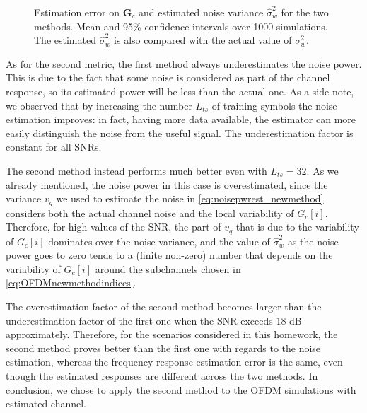 \documentclass[10pt]{article}
\begin{document}
\begin{figure}
\begin{minipage}{0.49\textwidth}
\end{minipage}
\caption{Estimation error on $\mathbf{G}_c$ and estimated noise variance $\hat{\sigma}_w^2$ for the two methods. Mean and 95\% confidence intervals over 1000 simulations. The estimated $\hat{\sigma}_w^2$ is also compared with the actual value of $\sigma_w^2$.}
\label{fig:p3_comparison}
\end{figure}

As for the second metric, the first method always underestimates the noise power. This is due to the fact that some noise is considered as part of the channel response, so its estimated power will be less than the actual one. As a side note, we observed that by increasing the number $L_{ts}$ of training symbols the noise estimation improves: in fact, having more data available, the estimator can more easily distinguish the noise from the useful signal. The underestimation factor is constant for all SNRs.

The second method instead performs much better even with $L_{ts} \! = \! 32$. As we already mentioned, the noise power in this case is overestimated, since the variance $v_q$ we used to estimate the noise in \eqref{eq:noisepwrest_newmethod} considers both the actual channel noise and the local variability of $G_c [i]$. Therefore, for high values of the SNR, the part of $v_q$ that is due to the variability of $G_c [i]$ dominates over the noise variance, and the value of $\hat{\sigma}_w^2$ as the noise power goes to zero tends to a (finite non-zero) number that depends on the variability of $G_c[i]$ around the subchannels chosen in \eqref{eq:OFDMnewmethodindices}.

The overestimation factor of the second method becomes larger than the underestimation factor of the first one when the SNR exceeds 18 dB approximately. Therefore, for the scenarios considered in this homework, the second method proves better than the first one with regards to the noise estimation, whereas the frequency response estimation error is the same, even though the estimated responses are different across the two methods. In conclusion, we chose to apply the second method to the OFDM simulations with estimated channel.
\end{document}
